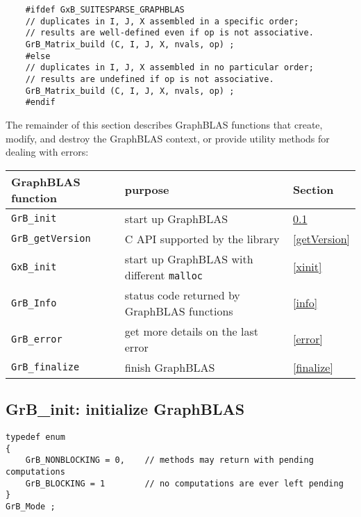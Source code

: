 \documentclass[12pt]{article}
\begin{document}
    {\footnotesize
    \begin{verbatim}
    #ifdef GxB_SUITESPARSE_GRAPHBLAS
    // duplicates in I, J, X assembled in a specific order;
    // results are well-defined even if op is not associative.
    GrB_Matrix_build (C, I, J, X, nvals, op) ;
    #else
    // duplicates in I, J, X assembled in no particular order;
    // results are undefined if op is not associative.
    GrB_Matrix_build (C, I, J, X, nvals, op) ;
    #endif \end{verbatim}}

The remainder of this section describes GraphBLAS functions that create,
modify, and destroy the GraphBLAS context, or provide utility methods for
dealing with errors:

\vspace{0.2in}
{\footnotesize
\begin{tabular}{lll}
\hline
GraphBLAS function   & purpose                                      & Section \\
\hline
\verb'GrB_init'      & start up GraphBLAS                           & \ref{init} \\
\verb'GrB_getVersion'& C API supported by the library               & \ref{getVersion} \\
\verb'GxB_init'      & start up GraphBLAS with different \verb'malloc' & \ref{xinit} \\
\verb'GrB_Info'      & status code returned by GraphBLAS functions  & \ref{info} \\
\verb'GrB_error'     & get more details on the last error           & \ref{error} \\
\verb'GrB_finalize'  & finish GraphBLAS                             & \ref{finalize} \\
\hline
\end{tabular}
}
\vspace{0.2in}

\subsection{{\sf GrB\_init:} initialize GraphBLAS} %
\label{init}

\begin{mdframed}[userdefinedwidth=6in]
{\footnotesize
\begin{verbatim}
typedef enum
{
    GrB_NONBLOCKING = 0,    // methods may return with pending computations
    GrB_BLOCKING = 1        // no computations are ever left pending
}
GrB_Mode ;
\end{verbatim}
}\end{mdframed}
\end{document}
